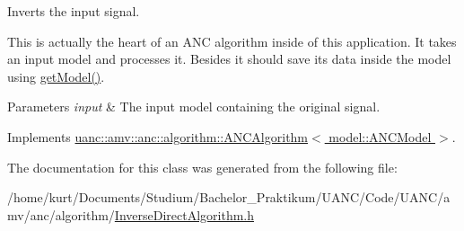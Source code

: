 Inverts the input signal. 

This is actually the heart of an A\+NC algorithm inside of this application. It takes an input model and processes it. Besides it should save its data inside the model using \hyperlink{classuanc_1_1amv_1_1anc_1_1algorithm_1_1_a_n_c_algorithm_a12ce80f6746cbb440cf771fc6878f7cf}{get\+Model()}.


\begin{DoxyParams}{Parameters}
{\em input} & The input model containing the original signal. \\
\hline
\end{DoxyParams}


Implements \hyperlink{classuanc_1_1amv_1_1anc_1_1algorithm_1_1_a_n_c_algorithm_abfdc7f14f7e41e408ee08037a839760d}{uanc\+::amv\+::anc\+::algorithm\+::\+A\+N\+C\+Algorithm$<$ model\+::\+A\+N\+C\+Model $>$}.



The documentation for this class was generated from the following file\+:\begin{DoxyCompactItemize}
\item 
/home/kurt/\+Documents/\+Studium/\+Bachelor\+\_\+\+Praktikum/\+U\+A\+N\+C/\+Code/\+U\+A\+N\+C/amv/anc/algorithm/\hyperlink{_inverse_direct_algorithm_8h}{Inverse\+Direct\+Algorithm.\+h}\end{DoxyCompactItemize}
